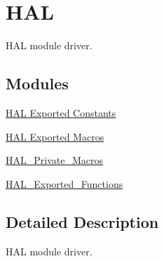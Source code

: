 \hypertarget{group___h_a_l}{}\section{H\+AL}
\label{group___h_a_l}


H\+AL module driver.  


\subsection*{Modules}
\begin{DoxyCompactItemize}
\item 
\hyperlink{group___h_a_l___exported___constants}{H\+A\+L Exported Constants}
\item 
\hyperlink{group___h_a_l___exported___macros}{H\+A\+L Exported Macros}
\item 
\hyperlink{group___h_a_l___private___macros}{H\+A\+L\+\_\+\+Private\+\_\+\+Macros}
\item 
\hyperlink{group___h_a_l___exported___functions}{H\+A\+L\+\_\+\+Exported\+\_\+\+Functions}
\end{DoxyCompactItemize}


\subsection{Detailed Description}
H\+AL module driver. 

